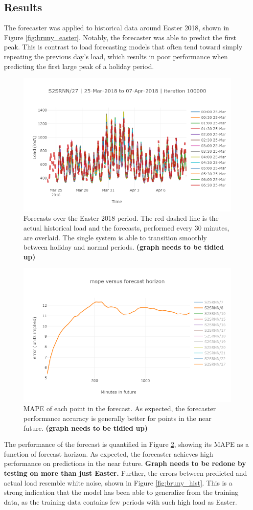 \documentclass[conference]{IEEEtran}
\begin{document}
\subsection{Results}

The forecaster was applied to historical data around Easter 2018, shown in Figure \ref{fig:bruny_easter}.
Notably, the forecaster was able to predict the first peak.
This is contrast to load forecasting models that often tend toward simply repeating the previous day's load, which results in poor performance when predicting the first large peak of a holiday period.


\begin{figure}[htbp]
	\centerline{\includegraphics[width=.35\textwidth]{images/easter_2018_all_forecast.png}}
	\caption{Forecasts over the Easter 2018 period.
		The red dashed line is the actual historical load and the forecasts, performed every 30 minutes, are overlaid.
		The single system is able to transition smoothly between holiday and normal periods.
		\textbf{(graph needs to be tidied up)}}
	\label{fig:easter_forecasts}
\end{figure}

\begin{figure}[htbp]
	\centerline{\includegraphics[width=.35\textwidth]{images/bruny_mape.png}}
	\caption{MAPE of each point in the forecast.
		     As expected, the forecaster performance accuracy is generally better for points in the near future.
		     \textbf{(graph needs to be tidied up)}}
	\label{fig:bruny_mape}
\end{figure}

The performance of the forecast is quantified in Figure \ref{fig:bruny_mape}, showing its MAPE as a function of forecast horizon.
As expected, the forecaster achieves high performance on predictions in the near future.
\textbf{Graph needs to be redone by testing on more than just Easter.}
Further, the errors between predicted and actual load resemble white noise, shown in Figure \ref{fig:bruny_hist}.
This is a strong indication that the model has been able to generalize from the training data, as the training data contains few periods with such high load as Easter.
\end{document}
